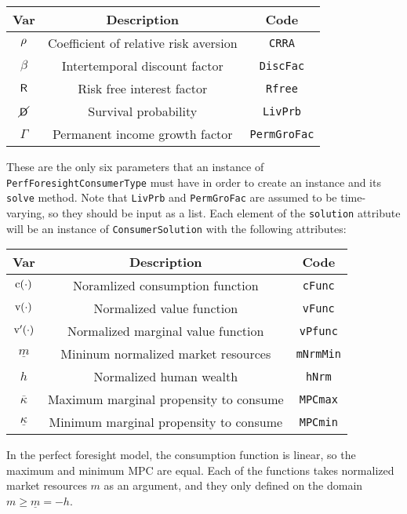 \documentclass[12pt,titlepage,letterpaper]{econtex}
\begin{document}
\begin{table}[h!]
\centering
\begin{tabular}{c c c}
Var & Description & Code \\
\hline
$\rho$ & Coefficient of relative risk aversion & \texttt{CRRA} \\
$\beta$ & Intertemporal discount factor & \texttt{DiscFac} \\
$\mathsf{R}$ & Risk free interest factor & \texttt{Rfree} \\
$\cancel{\mathsf{D}}$ & Survival probability & \texttt{LivPrb} \\
$\Gamma$ & Permanent income growth factor & \texttt{PermGroFac}
\end{tabular}
\end{table}

These are the only six parameters that an instance of \texttt{PerfForesightConsumerType} must have in order to create an instance and its \texttt{solve} method.  Note that \texttt{LivPrb} and \texttt{PermGroFac} are assumed to be time-varying, so they should be input as a list.  Each element of the \texttt{solution} attribute will be an instance of \texttt{ConsumerSolution} with the following attributes:

\begin{table}[h!]
\centering
\begin{tabular}{c c c}
Var & Description & Code \\
\hline
$\mathrm{c}(\cdot)$ & Noramlized consumption function & \texttt{cFunc} \\
$\mathrm{v}(\cdot)$ & Normalized value function & \texttt{vFunc} \\
$\mathrm{v}'(\cdot)$ & Normalized marginal value function & \texttt{vPfunc} \\
$\underline{m}$ & Mininum normalized market resources & \texttt{mNrmMin} \\
$h$ & Normalized human wealth & \texttt{hNrm} \\
$\overline{\kappa}$ & Maximum marginal propensity to consume & \texttt{MPCmax} \\
$\underline{\kappa}$ & Minimum marginal propensity to consume & \texttt{MPCmin} \\
\end{tabular}
\end{table}
In the perfect foresight model, the consumption function is linear, so the maximum and minimum MPC are equal.  Each of the functions takes normalized market resources $m$ as an argument, and they only defined on the domain $m \geq \underline{m} = -h$.
\end{document}
